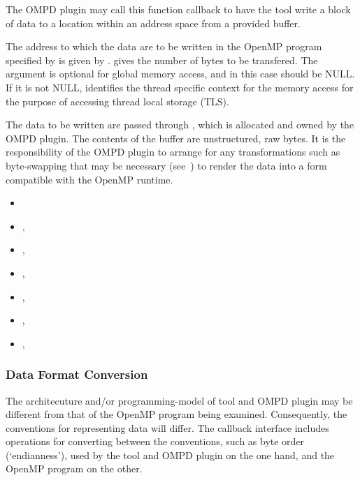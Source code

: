 \descr
The OMPD plugin may call this function callback to have the tool write a block of data
to a location within an address space from a provided buffer.

\argdesc
The address to which the data are to be written in the OpenMP program
specified by  is given by .
 gives the number of bytes to be transfered.
The  argument is optional for global memory access,
and in this case should be NULL.
If it is not NULL,  identifies the thread
specific context for the memory access for the purpose of accessing
thread local storage (TLS).

The data to be written are passed through , which is allocated and
owned by the OMPD plugin.
The contents of the buffer are unstructured, raw bytes.
It is the responsibility of the OMPD plugin to arrange for
any transformations such as byte-swapping that may be necessary
(see~)
to render the data into a form compatible with the OpenMP runtime.

\crossreferences
\begin{itemize}
\item
   
\item
  , 
\item
  , 
\item
  , 
\item
  , 
\item
  , 
\item
  , 
\end{itemize}

\subsubsection{Data Format Conversion}
\label{subsubsec:data-format-conversion}

The architecuture and/or programming-model of tool and
OMPD plugin may be different from that of the OpenMP program being
examined.
Consequently, the conventions for representing data will differ.
The callback interface includes operations for converting between
the conventions, such as byte order (`endianness'),
used by the tool and OMPD plugin on the
one hand, and the OpenMP program on the other.

